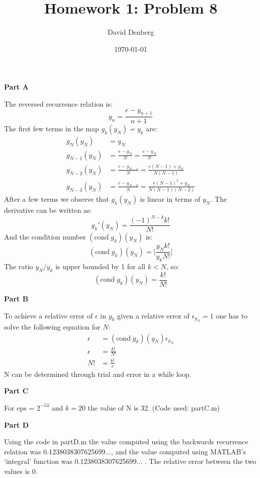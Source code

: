 \documentclass[12pt]{article}
\title{Homework 1: Problem 8}
\author{David Denberg}
\date{\today}
\begin{document}
\maketitle
\noindent
\textbf{Part A}

The reversed recurrence relation is:
\[
y_n = \frac{e - y_{n+1}}{n+1}
\]
The first few terms in the map $g_k(y_N) = y_k$ are:
\begin{align*}
g_N(y_N) &= y_N
\\
g_{N-1}(y_N) &= \frac{e - g_N}{N} = \frac{e - y_N}{N}
\\
g_{N-2}(y_N) &= \frac{e - g_{N-1}}{N} = \frac{e(N-1) + y_N}{N (N-1)}
\\
g_{N-3}(y_N) &= \frac{e - g_{N-2}}{N} = \frac{e(N-1)^2 + y_N}{N (N-1)(N-2)}
\end{align*}
After a few terms we observe that $g_k(y_N)$ is linear in terms of $y_N$. The derivative can be written as:
\[
g_k'(y_N) = \frac{(-1)^{N-k}k!}{N!}
\]
And the condition number $(\mathrm{cond} \; g_k)(y_N)$ is:
\[
(\mathrm{cond} \; g_k)(y_N) = \bigg| \frac{y_N k!}{y_k N!} \bigg|
\]
The ratio $y_N / y_k$ is upper bounded by 1 for all $k < N$, so:
\[
(\mathrm{cond} \; g_k)(y_N) = \frac{k!}{N!}
\]

\noindent
\textbf{Part B}

To achieve a relative error of $\epsilon$ in $y_k$ given a relative error of $\epsilon_{y_N} = 1$ one has to solve the following equation for $N$:
\begin{align*}
\epsilon &= (\mathrm{cond} \; g_k)(y_N) \epsilon_{y_N}
\\
\epsilon &= \frac{k!}{N!}
\\
N! &= \frac{k!}{\epsilon}
\end{align*}
N can be determined through trial and error in a while loop.

\noindent
\textbf{Part C}

For eps = $2^{-53}$ and $k = 20$ the value of N is 32. (Code used: partC.m)

\noindent
\textbf{Part D}

Using the code in partD.m the value computed using the backwards recurrence relation was 0.1238038307625699..., and the value computed using MATLAB's `integral' function was 0.1238038307625699... . The relative error between the two values is 0.
\end{document}
